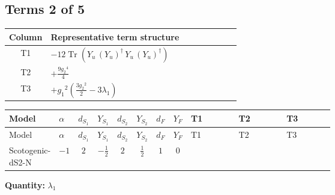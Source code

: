 \documentclass[8pt]{article}
\begin{document}
\begin{landscape}
\subsection*{Terms 2 of 5}
\begin{center}
\begin{tabular}{@{}c >{\raggedright\arraybackslash}p{0.82\linewidth}@{}}
\toprule
Column & Representative term structure \\
\midrule
T1 & \(\displaystyle -12 \operatorname{Tr}\!\left({Y_u}\,\left({Y_u}\right)^{\dagger}\,{Y_u}\,\left({Y_u}\right)^{\dagger}\right)\) \\
\midrule
T2 & \(\displaystyle +\frac{9 {g_2}^4}{4}\) \\
\midrule
T3 & \(\displaystyle +{g_1}^2 \left(\frac{3 {g_2}^2}{2}-3 {\lambda_1}\right)\) \\
\midrule
\bottomrule
\end{tabular}
\end{center}
\smallskip
\tiny
\begin{longtable}{@{}llcccccc >{\raggedright\arraybackslash}p{0.21\linewidth} >{\raggedright\arraybackslash}p{0.21\linewidth} >{\raggedright\arraybackslash}p{0.21\linewidth}@{}}
\toprule
Model & $\alpha$ & $d_{S_1}$ & $Y_{S_1}$ & $d_{S_2}$ & $Y_{S_2}$ & $d_F$ & $Y_F$ & T1 & T2 & T3 \\
\midrule
\endfirsthead
\toprule
Model & $\alpha$ & $d_{S_1}$ & $Y_{S_1}$ & $d_{S_2}$ & $Y_{S_2}$ & $d_F$ & $Y_F$ & T1 & T2 & T3 \\
\midrule
\endhead
Scotogenic-dS2-N & $-1$ & $2$ & $-\frac{1}{2}$ & $2$ & $\frac{1}{2}$ & $1$ & $0$ & \scriptsize\adjustbox{max width=\linewidth}{$\begin{gathered} -12 \operatorname{Tr}\!\left({Y_u}\,\left({Y_u}\right)^{\dagger}\,{Y_u}\,\left({Y_u}\right)^{\dagger}\right)\end{gathered}$} & \scriptsize\adjustbox{max width=\linewidth}{$\begin{gathered} +\frac{9 {g_2}^4}{4}\end{gathered}$} & \scriptsize\adjustbox{max width=\linewidth}{$\begin{gathered} +{g_1}^2 \left(\frac{3 {g_2}^2}{2}-3 {\lambda_1}\right)\end{gathered}$} \\
\midrule
\bottomrule
\end{longtable}
\clearpage
\noindent\textbf{Quantity: }$\lambda_1$\par\smallskip

\end{landscape}
\end{document}
